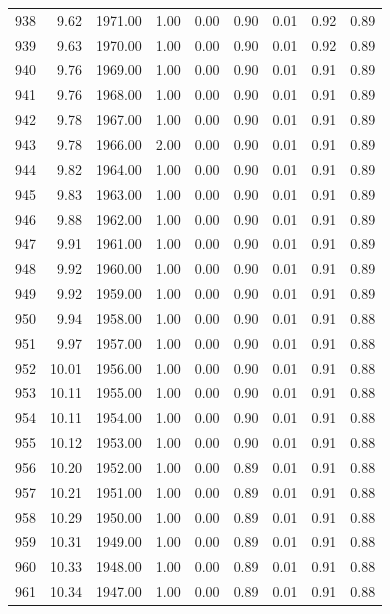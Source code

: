 \documentclass{article}\usepackage[]{graphicx}\usepackage[]{color}
\begin{document}
\begin{longtable}{rrrrrrrrr}
  938 & 9.62 & 1971.00 & 1.00 & 0.00 & 0.90 & 0.01 & 0.92 & 0.89 \\ 
  939 & 9.63 & 1970.00 & 1.00 & 0.00 & 0.90 & 0.01 & 0.92 & 0.89 \\ 
  940 & 9.76 & 1969.00 & 1.00 & 0.00 & 0.90 & 0.01 & 0.91 & 0.89 \\ 
  941 & 9.76 & 1968.00 & 1.00 & 0.00 & 0.90 & 0.01 & 0.91 & 0.89 \\ 
  942 & 9.78 & 1967.00 & 1.00 & 0.00 & 0.90 & 0.01 & 0.91 & 0.89 \\ 
  943 & 9.78 & 1966.00 & 2.00 & 0.00 & 0.90 & 0.01 & 0.91 & 0.89 \\ 
  944 & 9.82 & 1964.00 & 1.00 & 0.00 & 0.90 & 0.01 & 0.91 & 0.89 \\ 
  945 & 9.83 & 1963.00 & 1.00 & 0.00 & 0.90 & 0.01 & 0.91 & 0.89 \\ 
  946 & 9.88 & 1962.00 & 1.00 & 0.00 & 0.90 & 0.01 & 0.91 & 0.89 \\ 
  947 & 9.91 & 1961.00 & 1.00 & 0.00 & 0.90 & 0.01 & 0.91 & 0.89 \\ 
  948 & 9.92 & 1960.00 & 1.00 & 0.00 & 0.90 & 0.01 & 0.91 & 0.89 \\ 
  949 & 9.92 & 1959.00 & 1.00 & 0.00 & 0.90 & 0.01 & 0.91 & 0.89 \\ 
  950 & 9.94 & 1958.00 & 1.00 & 0.00 & 0.90 & 0.01 & 0.91 & 0.88 \\ 
  951 & 9.97 & 1957.00 & 1.00 & 0.00 & 0.90 & 0.01 & 0.91 & 0.88 \\ 
  952 & 10.01 & 1956.00 & 1.00 & 0.00 & 0.90 & 0.01 & 0.91 & 0.88 \\ 
  953 & 10.11 & 1955.00 & 1.00 & 0.00 & 0.90 & 0.01 & 0.91 & 0.88 \\ 
  954 & 10.11 & 1954.00 & 1.00 & 0.00 & 0.90 & 0.01 & 0.91 & 0.88 \\ 
  955 & 10.12 & 1953.00 & 1.00 & 0.00 & 0.90 & 0.01 & 0.91 & 0.88 \\ 
  956 & 10.20 & 1952.00 & 1.00 & 0.00 & 0.89 & 0.01 & 0.91 & 0.88 \\ 
  957 & 10.21 & 1951.00 & 1.00 & 0.00 & 0.89 & 0.01 & 0.91 & 0.88 \\ 
  958 & 10.29 & 1950.00 & 1.00 & 0.00 & 0.89 & 0.01 & 0.91 & 0.88 \\ 
  959 & 10.31 & 1949.00 & 1.00 & 0.00 & 0.89 & 0.01 & 0.91 & 0.88 \\ 
  960 & 10.33 & 1948.00 & 1.00 & 0.00 & 0.89 & 0.01 & 0.91 & 0.88 \\ 
  961 & 10.34 & 1947.00 & 1.00 & 0.00 & 0.89 & 0.01 & 0.91 & 0.88 \\ 

\end{longtable}
\end{document}
